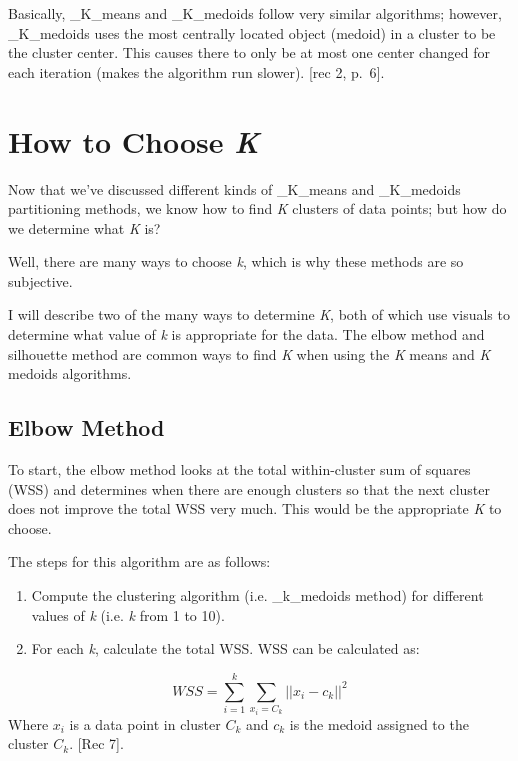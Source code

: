 \documentclass[12pt,twoside]{amherstthesis}
\providecommand{\tightlist}{%
  \setlength{\itemsep}{0pt}\setlength{\parskip}{0pt}}
\begin{document}
  Basically, \_K\_means and \_K\_medoids follow very similar algorithms;
  however, \_K\_medoids uses the most centrally located object (medoid) in
  a cluster to be the cluster center. This causes there to only be at most
  one center changed for each iteration (makes the algorithm run slower).
  {[}rec 2, p.~6{]}.
  
  \section{\texorpdfstring{How to Choose
  \emph{K}}{How to Choose K}}\label{how-to-choose-k}
  
  Now that we've discussed different kinds of \_K\_means and \_K\_medoids
  partitioning methods, we know how to find \emph{K} clusters of data
  points; but how do we determine what \emph{K} is?
  
  Well, there are many ways to choose \emph{k}, which is why these methods
  are so subjective.
  
  I will describe two of the many ways to determine \emph{K}, both of
  which use visuals to determine what value of \emph{k} is appropriate for
  the data. The elbow method and silhouette method are common ways to find
  \emph{K} when using the \emph{K} means and \emph{K} medoids algorithms.
  
  \subsection{Elbow Method}\label{elbow-method}
  
  To start, the elbow method looks at the total within-cluster sum of
  squares (WSS) and determines when there are enough clusters so that the
  next cluster does not improve the total WSS very much. This would be the
  appropriate \emph{K} to choose.
  
  The steps for this algorithm are as follows:
  
  \begin{enumerate}
  \def\labelenumi{\arabic{enumi}.}
  \tightlist
  \item
    Compute the clustering algorithm (i.e. \_k\_medoids method) for
    different values of \emph{k} (i.e. \emph{k} from 1 to 10).
  \item
    For each \emph{k}, calculate the total WSS. WSS can be calculated as:
  \end{enumerate}
  
  \[WSS= \sum_{i=1}^k \sum_{x_i = C_k} ||{{x_i- c_k}}||^2\] Where \(x_i\)
  is a data point in cluster \(C_k\) and \(c_k\) is the medoid assigned to
  the cluster \(C_k\). {[}Rec 7{]}.
  
\end{document}
